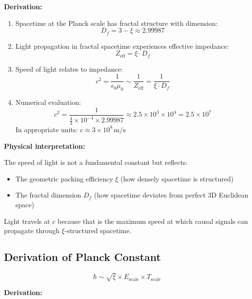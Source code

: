 	\textbf{Derivation:}
	
	\begin{enumerate}
		\item Spacetime at the Planck scale has fractal structure with dimension:
		\[
		D_f = 3 - \xi \approx 2.99987
		\]
		
		\item Light propagation in fractal spacetime experiences effective impedance:
		\[
		Z_{\text{eff}} = \xi \cdot D_f
		\]
		
		\item Speed of light relates to impedance:
		\[
		c^2 = \frac{1}{\epsilon_0 \mu_0} \sim \frac{1}{Z_{\text{eff}}} = \frac{1}{\xi \cdot D_f}
		\]
		
		\item Numerical evaluation:
		\[
		c^2 = \frac{1}{\frac{4}{3} \times 10^{-4} \times 2.99987} \approx 2.5 \times 10^{3} \times 10^{4} = 2.5 \times 10^7
		\]
		In appropriate units: $c \approx 3 \times 10^8\,\text{m/s}$
	\end{enumerate}
	
	\textbf{Physical interpretation:}
	
	The speed of light is not a fundamental constant but reflects:
	\begin{itemize}
		\item The geometric packing efficiency $\xi$ (how densely spacetime is structured)
		\item The fractal dimension $D_f$ (how spacetime deviates from perfect 3D Euclidean space)
	\end{itemize}
	
	Light travels at $c$ because that is the maximum speed at which causal signals can propagate through $\xi$-structured spacetime.
	
	\subsection{Derivation of Planck Constant}
	
	\begin{keyresult}
		\[
		\hbar \sim \sqrt{\xi} \times E_{\text{scale}} \times T_{\text{scale}}
		\]
	\end{keyresult}
	
	\textbf{Derivation:}
	
